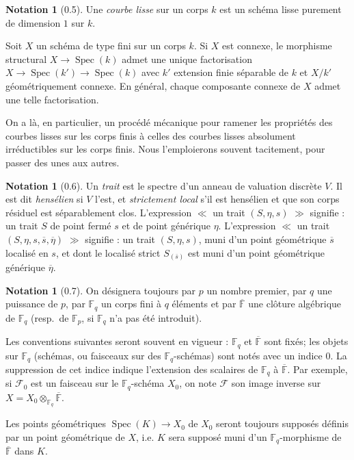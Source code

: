 \documentclass[12pt,a4paper]{article}
\theoremstyle{plain}
\theoremstyle{definition}
\newtheorem{notation}[theorem]{Notation}
\theoremstyle{definition}
\theoremstyle{remark}
\DeclareMathOperator{\Spec}{Spec}
\begin{document}
\begin{notation}[0.5]
Une \emph{courbe lisse} sur un corps $k$ est un sch\'ema lisse purement de dimension $1$ sur $k$.

Soit $X$ un sch\'ema de type fini sur un corps $k$. Si $X$ est connexe, le morphisme structural $X \to \Spec(k)$ admet une unique factorisation $X \to \Spec(k') \to \Spec(k)$ avec $k'$ extension finie s\'eparable de $k$ et $X/k'$ g\'eom\'etriquement connexe. En g\'en\'eral, chaque composante connexe de $X$ admet une telle factorisation.

On a l\`a, en particulier, un proc\'ed\'e m\'ecanique pour ramener les propri\'et\'es des courbes lisses sur les corps finis \`a celles des courbes lisses absolument irr\'eductibles sur les corps finis. Nous l'emploierons souvent tacitement, pour passer des unes aux autres.
\end{notation}

\begin{notation}[0.6]
Un \emph{trait} est le spectre d'un anneau de valuation discr\`ete $V$. Il est dit \emph{hens\'elien} si $V$ l'est, et \emph{strictement local} s'il est hens\'elien et que son corps r\'esiduel est s\'eparablement clos. L'expression $\ll$ un trait $(S, \eta, s)$ $\gg$ signifie : un trait $S$ de point ferm\'e $s$ et de point g\'en\'erique $\eta$. L'expression $\ll$ un trait $(S, \eta, s, \overline{s}, \overline{\eta})$ $\gg$ signifie : un trait $(S, \eta, s)$, muni d'un point g\'eom\'etrique $\overline{s}$ localis\'e en $s$, et dont le localis\'e strict $S_{(\overline{s})}$ est muni d'un point g\'eom\'etrique g\'en\'erique $\overline{\eta}$.
\end{notation}

\begin{notation}[0.7]
On d\'esignera toujours par $p$ un nombre premier, par $q$ une puissance de $p$, par $\mathbb{F}_q$ un corps fini \`a $q$ \'el\'ements et par $\overline{\mathbb{F}}$ une cl\^oture alg\'ebrique de $\mathbb{F}_q$ (resp.~de $\mathbb{F}_p$, si $\mathbb{F}_q$ n'a pas \'et\'e introduit).

Les conventions suivantes seront souvent en vigueur : $\mathbb{F}_q$ et $\overline{\mathbb{F}}$ sont fix\'es; les objets sur $\mathbb{F}_q$ (sch\'emas, ou faisceaux sur des $\mathbb{F}_q$-sch\'emas) sont not\'es avec un indice $0$. La suppression de cet indice indique l'extension des scalaires de $\mathbb{F}_q$ \`a $\overline{\mathbb{F}}$. Par exemple, si $\mathscr{F}_0$ est un faisceau sur le $\mathbb{F}_q$-sch\'ema $X_0$, on note $\mathscr{F}$ son image inverse sur $X = X_0 \otimes_{\mathbb{F}_q} \overline{\mathbb{F}}$.

Les points g\'eom\'etriques $\Spec(K) \to X_0$ de $X_0$ seront toujours suppos\'es d\'efinis par un point g\'eom\'etrique de $X$, i.e. $K$ sera suppos\'e muni d'un $\mathbb{F}_q$-morphisme de $\overline{\mathbb{F}}$ dans $K$.
\end{notation}
\end{document}
